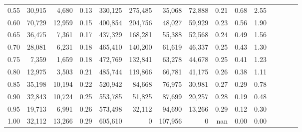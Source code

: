 \begin{tabular}{rrrcrrrrrrrrrrr}
0.55 &  30,915 &   4,680 &                                       0.13 &  330,125 &  275,485 &   35,068 &   72,888 &  0.21 &  0.68 &                         2.55 \\
0.60 &  70,729 &  12,959 &                                       0.15 &  400,854 &  204,756 &   48,027 &   59,929 &  0.23 &  0.56 &                         1.90 \\
0.65 &  36,475 &   7,361 &                                       0.17 &  437,329 &  168,281 &   55,388 &   52,568 &  0.24 &  0.49 &                         1.56 \\
0.70 &  28,081 &   6,231 &                                       0.18 &  465,410 &  140,200 &   61,619 &   46,337 &  0.25 &  0.43 &                         1.30 \\
0.75 &   7,359 &   1,659 &                                       0.18 &  472,769 &  132,841 &   63,278 &   44,678 &  0.25 &  0.41 &                         1.23 \\
0.80 &  12,975 &   3,503 &                                       0.21 &  485,744 &  119,866 &   66,781 &   41,175 &  0.26 &  0.38 &                         1.11 \\
0.85 &  35,198 &  10,194 &                                       0.22 &  520,942 &   84,668 &   76,975 &   30,981 &  0.27 &  0.29 &                         0.78 \\
0.90 &  32,843 &  10,724 &                                       0.25 &  553,785 &   51,825 &   87,699 &   20,257 &  0.28 &  0.19 &                         0.48 \\
0.95 &  19,713 &   6,991 &                                       0.26 &  573,498 &   32,112 &   94,690 &   13,266 &  0.29 &  0.12 &                         0.30 \\
1.00 &  32,112 &  13,266 &                                       0.29 &  605,610 &        0 &  107,956 &        0 &   nan &  0.00 &                         0.00 \\
\bottomrule
\end{tabular}

